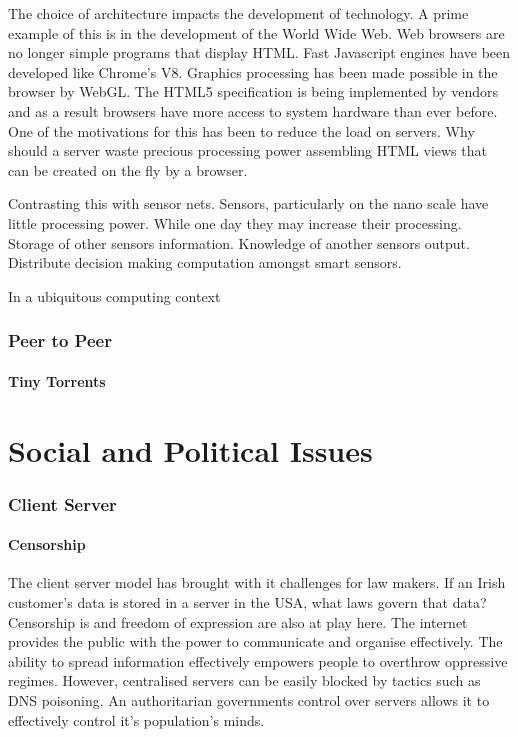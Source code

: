 \documentclass[11pt]{amsart}
\begin{document}
The choice of architecture impacts the development of technology. A prime example of this is in the development of the World Wide Web. Web browsers are no longer simple programs that display HTML. Fast Javascript engines have been developed like Chrome's V8. Graphics processing has been made possible in the browser by WebGL. The HTML5 specification is being implemented by vendors and as a result browsers have more access to system hardware than ever before. One of the motivations for this has been to reduce the load on servers. Why should a server waste precious processing power assembling HTML views that can be created on the fly by a browser.

Contrasting this with sensor nets. Sensors, particularly on the nano scale have little processing power. While one day they may increase their processing. Storage of other sensors information.
Knowledge of another sensors output.
Distribute decision making computation amongst smart sensors.

In a ubiquitous computing context 



\section{Peer to Peer}
\subsection{Tiny Torrents}


\part{Social and Political Issues}
\section{Client Server}
\subsection{Censorship}
The client server model has brought with it challenges for law makers. If an Irish customer's data is stored in a server in the USA, what laws govern that data?
Censorship is and freedom of expression are also at play here. The internet provides the public with the power to communicate and organise effectively. The ability to spread information effectively empowers people to overthrow oppressive regimes. However, centralised servers can be easily blocked by tactics such as DNS poisoning. An authoritarian governments control over servers allows it to effectively control it's population's minds.
\end{document}
